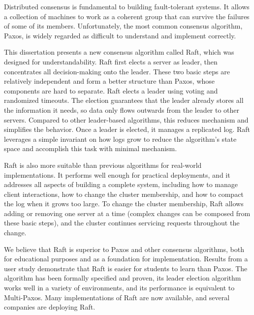 
Distributed consensus is fundamental to building fault-tolerant systems.
It allows a collection of machines to work as a coherent group that can
survive the failures of some of its members. Unfortunately, the most
common consensus algorithm, Paxos, is widely regarded as difficult to
understand and implement correctly.

This dissertation presents a new consensus algorithm called Raft, which
was designed for understandability. Raft first elects a server as leader,
then concentrates all decision-making onto the leader. These two basic
steps are relatively independent and form a better structure than Paxos,
whose components are hard to separate. Raft elects a leader using voting
and randomized timeouts. The election guarantees that the leader already
stores all the information it needs, so data only flows outwards
from the leader to other servers. Compared to other leader-based
algorithms, this reduces mechanism and simplifies the behavior. Once a
leader is elected, it manages a replicated log. Raft leverages a simple
invariant on how logs grow to reduce the algorithm's state space and
accomplish this task with minimal mechanism.

Raft is also more suitable than previous algorithms for real-world
implementations. It performs well enough for practical deployments, and
it addresses all aspects of building a complete system, including how to
manage client interactions, how to change the cluster membership, and
how to compact the log when it grows too large. To change the cluster
membership, Raft allows adding or removing one server at a time (complex
changes can be composed from these basic steps), and the cluster
continues servicing requests throughout the change.

We believe that Raft is superior to Paxos and other consensus
algorithms, both for educational purposes and as a foundation for
implementation. Results from a user study demonstrate that Raft is
easier for students to learn than Paxos. The algorithm has been formally
specified and proven, its leader election algorithm
works well in a variety of environments, and its performance is
equivalent to Multi-Paxos. Many implementations of Raft are now
available, and several companies are deploying Raft.

